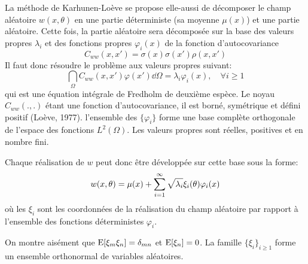 La méthode de Karhunen-Loève se propose elle-aussi de décomposer le champ aléatoire $w(x,\theta)$ en une partie déterministe (sa moyenne $\mu(x)$) et une partie aléatoire.
Cette fois, la partie aléatoire sera décomposée sur la base des valeurs propres $\lambda_i$ et des fonctions propres $\varphi_i(x)$ de la fonction d'autocovariance
\begin{equation}
C_{ww}(x,x')=\sigma(x)\sigma(x')\rho(x,x')
\end{equation}
Il faut donc résoudre le problème aux valeurs propres suivant:
\begin{equation}
\dint_\Omega C_{ww}(x,x')\varphi(x')\dd \Omega = \lambda_i\varphi_i(x), \quad \forall i\ge 1
\end{equation}
qui est une équation intégrale de Fredholm de deuxième espèce.
Le noyau $C_{ww}(.,.)$ étant une fonction d'autocovariance, il est borné, symétrique et défini positif (Loève, 1977). l'ensemble des $\{\varphi_i\}$ forme une base complète orthogonale de l'espace des fonctions $L^2(\Omega)$. Les valeurs propres sont réelles, positives et en nombre fini. 

\medskip
Chaque réalisation de $w$ peut donc être développée sur cette base sous la forme:
\begin{equation}\label{Eq-KL}
w(x,\theta) = \mu(x) + \displaystyle\sum_{i=1}^\infty \sqrt{\lambda_i}\xi_i(\theta)\varphi_i(x)
\end{equation}
où les $\xi_i$ sont les coordonnées de la réalisation du champ aléatoire par rapport à l'ensemble des fonctions déterministes $\varphi_i$.

On montre aisément que $\operatorname{E}[\xi_m\xi_n]=\delta_{mn}$ et $\operatorname{E}[\xi_n]=0$. La famille $\{\xi_i\}_{i\ge1}$ forme un ensemble orthonormal de variables aléatoires.

